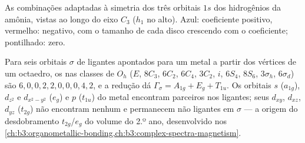 \begin{omfigure}

{\small As combinações adaptadas à simetria dos três orbitais $1s$ dos
hidrogênios da amônia, vistas ao longo do eixo $C_3$ ($h_1$ no alto). Azul:
coeficiente positivo, vermelho: negativo, com o tamanho de cada disco
crescendo com o coeficiente; pontilhado: zero.}
\end{omfigure}

\begin{example}\label{ex:b3:group-theory-applied:ml6}
Para seis orbitais $\sigma$ de ligantes apontados para um metal a partir dos
vértices de um octaedro, os  nas classes de $O_h$ ($E$, $8C_3$, $6C_2$, $6C_4$,
$3C_2$, $i$, $6S_4$, $8S_6$, $3\sigma_h$, $6\sigma_d$) são $6, 0, 0, 2, 2, 0, 0, 0, 4,
2$, e a redução dá $\Gamma_\sigma = A_{1g} + E_g + T_{1u}$. Os orbitais $s$
($a_{1g}$), $d_{z^2}$ e $d_{x^2-y^2}$ ($e_g$) e $p$ ($t_{1u}$) do metal encontram
parceiros nos ligantes; seus $d_{xy}$, $d_{xz}$, $d_{yz}$ ($t_{2g}$) não encontram
nenhum e permanecem não ligantes em $\sigma$ --- a origem do desdobramento
$t_{2g}$/$e_g$ do volume do 2.º ano, desenvolvido nos
\cref{ch:b3:organometallic-bonding,ch:b3:complex-spectra-magnetism}.
\end{example}

